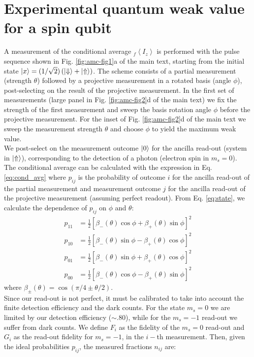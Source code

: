 \section {Experimental quantum weak value for a spin qubit}
A measurement of the conditional average $ _f \left \langle I_z \right \rangle$ is performed with the pulse sequence shown in Fig. \ref{fig:amc-fig1}a of the main text, starting from the initial state $\left|x\right> = (1/\sqrt{2}) \left( \left|\Downarrow\right> + \left|\Uparrow\right> \right)$. The scheme consists of a partial measurement (strength $\theta$) followed by a projective measurement in a rotated basis (angle $\phi$), post-selecting on the result of the projective measurement. In the first set of measurements (large panel in Fig. \ref{fig:amc-fig2}d of the main text) we fix the strength of the first measurement and sweep the basis rotation angle $\phi$ before the projective measurement. For the inset of Fig. \ref{fig:amc-fig2}d of the main text we sweep the measurement strength $\theta$ and choose $\phi$ to yield the maximum weak value. \\
We post-select on the measurement outcome $\left|0\right>$ for the ancilla read-out (system in $\left|\Uparrow\right>$), corresponding to the detection of a photon (electron spin in $m_s=0$). \\
The conditional average can be calculated with the expression in Eq. \ref {eq:cond_avg} where $p_{ij}$ is the probability of outcome $i$ for the ancilla read-out of the partial measurement and measurement outcome $j$ for the ancilla read-out of the projective measurement (assuming perfect readout). From Eq. \ref{eq:state}, we calculate the dependence of $p_{ij}$ on $\phi$ and $\theta$:
\begin{equation}
\label{eq:prob_wm}
  \begin{split}
  p_{11}&=\frac{1}{2} \left[ \beta_-(\theta) \cos\phi + \beta_+ (\theta) \sin\phi \right]^2  \\
  p_{10}&= \frac{1}{2} \left[ \beta_-(\theta) \sin\phi - \beta_+ (\theta) \cos\phi\right]^2 \\
  p_{01}&= \frac{1}{2} \left[ \beta_-(\theta) \sin\phi + \beta_+ (\theta) \cos\phi\right]^2 \\
  p_{00}&=\frac{1}{2} \left[ \beta_-(\theta) \cos\phi - \beta_+ (\theta) \sin\phi \right]^2 
  \end{split}
\end{equation}
where $\beta_{\pm} (\theta) = \cos (\pi/4 \pm \theta/2)$.\\
 
Since our read-out is not perfect, it must be calibrated to take into account the finite detection efficiency and the dark counts. For the state $m_s=0$ we are limited by our detection efficiency ($\sim .80$), while for the $m_s=-1$ read-out we suffer from dark counts. We define $F_i$ as the fidelity of the $m_s=0$ read-out and $G_i$ as the read-out fidelity for $m_s=-1$, in the $i-$th measurement.
Then, given the ideal probabilities $p_{ij}$, the measured fractions $n_{ij}$ are:
 
